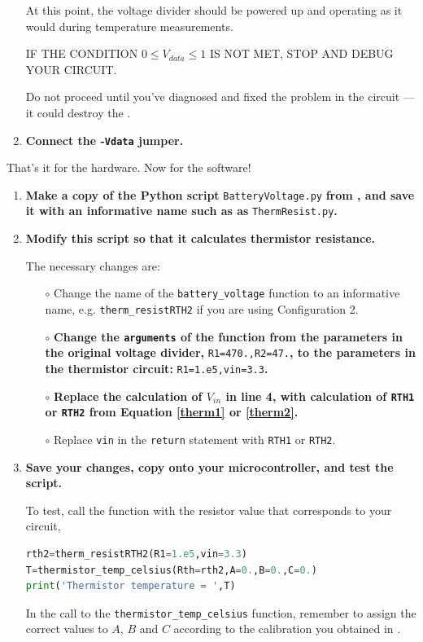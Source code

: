 \begin{enumerate}
	At this point, the voltage divider should be powered up and operating as it would during temperature measurements.
	
	\smallskip
	IF THE CONDITION $0 \le V_{data} \le 1$ IS NOT MET, STOP AND DEBUG YOUR CIRCUIT.
	
	\smallskip
	Do not proceed until you've diagnosed and fixed the problem in the circuit --- it could destroy the \adc.

	\item \textbf{Connect the \adc-\texttt{Vdata} jumper.}
		
\end{enumerate}
That's it for the hardware.
Now for the software!

\begin{enumerate}[resume]
	\item \textbf{Make a copy of the Python script }\lstinline{BatteryVoltage.py} \textbf{from , and save it with an informative name such as as }\lstinline{ThermResist.py}\textbf{.}
	
	\item \textbf{Modify this script so that it calculates thermistor resistance.}
	
	The necessary changes are:
	\begin{itemize}
		\item[$\circ$] Change the name of the \lstinline{battery_voltage} function to an informative name, e.g. \lstinline{therm_resistRTH2} if you are using Configuration 2. 
		
		\item[$\circ$] \textbf{Change the \texttt{arguments} of the function from the parameters in the original voltage divider,} \lstinline{R1=470.,R2=47.}\textbf{, to the parameters in the thermistor circuit:} \lstinline{R1=1.e5,vin=3.3}\textbf{.} 
		
		\item[$\circ$] \textbf{Replace the calculation of $V_{in}$ in line 4, with calculation of \texttt{RTH1} or \texttt{RTH2} from Equation \ref{therm1} or \ref{therm2}.}
	
		\item[$\circ$] Replace \texttt{vin} in the \texttt{return} statement with \texttt{RTH1} or \texttt{RTH2}.
	\end{itemize}
	
	\item \textbf{Save your changes, copy onto your microcontroller, and test the script.}

	To test, call the function with the resistor value that corresponds to your circuit,
\begin{lstlisting}[language=Python]
rth2=therm_resistRTH2(R1=1.e5,vin=3.3)
T=thermistor_temp_celsius(Rth=rth2,A=0.,B=0.,C=0.)
print('Thermistor temperature = ',T)
\end{lstlisting}	
	In the call to the \lstinline{thermistor_temp_celsius} function, remember to assign the correct values to $A$, $B$ and $C$ according to the calibration you obtained in .
	
	
\end{enumerate}

